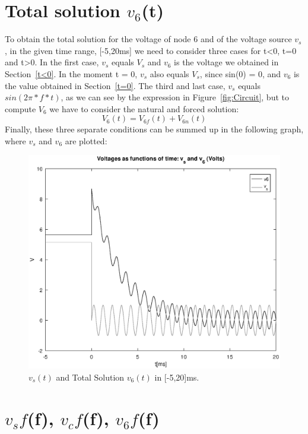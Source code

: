 \section{Total solution $v_6$(t)}
To obtain the total solution for the voltage of node 6 and of the voltage source $v_s$, in the given time range, 
[-5,20ms] we need to consider three cases for t<0, t=0 and t>0.
In the first case, $v_s$ equals $V_s$ and $v_6$ is the voltage we obtained in Section~\ref{t<0}.
In the moment t = 0, $v_s$ also equals $V_s$, since sin(0) = 0, and $v_6$ is the value obtained in Section~\ref{t=0}.
The third and last case, $v_s$ equals $sin(2\pi*f*t)$, as we can see by the expression in Figure~\ref{fig:Circuit}, but to compute $V_6$ we have to consider the natural and forced solution:
\begin{equation}
{V_6}(t) = V_{6f}(t) + V_{6n}(t)
\label{eq:v6fcomplete}
\end{equation}
\noindent Finally, these three separate conditions can be summed up in the following graph, where $v_s$ and $v_6$ are plotted:
\begin{figure}[h!] \centering
\includegraphics[width=0.8\linewidth]{v6.eps}
\caption{$v_{s}(t)$ and Total Solution $v_{6}(t)$ in [-5,20]ms.}
\label{fig:v6t}
\end{figure}

\newpage
\section{$v_sf$(f), $v_cf$(f), $v_6f$(f)}

